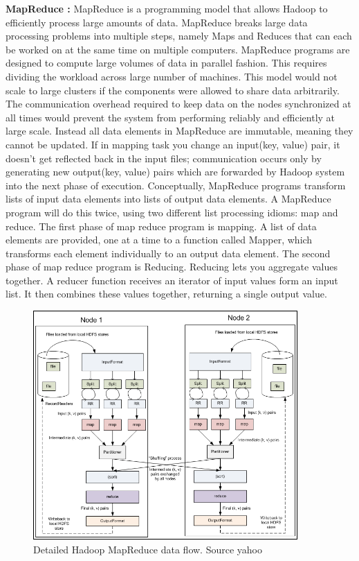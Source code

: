 \documentclass{osuthesis}
\begin{document}
				\par \textbf{MapReduce :} MapReduce \cite{dean2008} is a programming model that allows Hadoop to efficiently process large amounts of data. MapReduce breaks large data processing problems into multiple steps, namely Maps and Reduces that can each be worked on at the same time on multiple computers. MapReduce programs are designed to compute large volumes of data in parallel fashion. This requires dividing the workload across large number of machines. This model would not scale to large clusters if the components were allowed to share data arbitrarily. The communication overhead required to keep data on the nodes synchronized at all times would prevent the system from performing reliably and efficiently at large scale. Instead all data elements in MapReduce are immutable, meaning they cannot be updated. If in mapping task you change an input(key, value) pair, it doesn’t get reflected back in the input files; communication occurs only by generating new output(key, value) pairs which are forwarded by Hadoop system into the next phase of execution. Conceptually, MapReduce programs transform lists of input data elements into lists of output data elements. A MapReduce program will do this twice, using two different list processing idioms: map and reduce. The first phase of map reduce program is mapping. A list of data elements are provided, one at a time to a function called Mapper, which transforms each element individually to an output data element. The second phase of map reduce program is Reducing. Reducing lets you aggregate values together. A reducer function receives an iterator of input values form an input list. It then combines these values together, returning a single output value.
				\begin{figure}
				\centering
				    \includegraphics[width=0.90\textwidth]{images/yahoo.png}
				    \caption{Detailed Hadoop MapReduce data flow. Source yahoo}
				    \label{Fig: Detailed Hadoop MapReduce data flow. Source yahoo }
				\end{figure}
\end{document}
